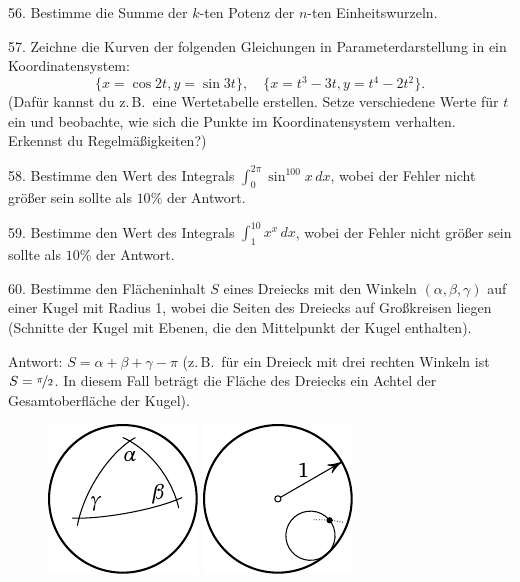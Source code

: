 \begin{problem}{56.}
	Bestimme die Summe der $k$-ten Potenz der $n$-ten Einheitswurzeln.
\end{problem}

\begin{problem}{57.}
	Zeichne die Kurven der folgenden Gleichungen in Parameterdarstellung in ein Koordinatensystem:
	\begin{equation*}
		\{x=\cos 2t, y=\sin 3t\},\quad
		\{x=t^3-3t, y=t^4-2t^2\}.
	\end{equation*}
	(Dafür kannst du z.\,B.\ eine Wertetabelle erstellen. Setze verschiedene Werte für $t$ ein und beobachte, wie sich die Punkte im Koordinatensystem verhalten. Erkennst du Regelmäßigkeiten?)
\end{problem}

\begin{problem}{58.}
	Bestimme den Wert des Integrals $\int_0^{2\pi} \sin^{100} x\,dx$, wobei der Fehler nicht größer sein sollte als $10\%$ der Antwort.
\end{problem}

\begin{problem}{59.}
	Bestimme den Wert des Integrals $\int_1^{10} x^x\,dx$, wobei der Fehler nicht größer sein sollte als $10\%$ der Antwort.
\end{problem}

\begin{problem}{60.}
	Bestimme den Flächeninhalt $S$ eines Dreiecks mit den Winkeln $(\alpha, \beta, \gamma)$ auf einer Kugel mit Radius 1, wobei die Seiten des Dreiecks auf Großkreisen liegen (Schnitte der Kugel mit Ebenen, die den Mittelpunkt der Kugel enthalten).

		\begin{note}{Antwort:} $S=\alpha+\beta+\gamma-\pi$ (z.\,B.\ für ein Dreieck mit drei rechten Winkeln ist $S=\nicefrac{\pi}{2}$. In diesem Fall beträgt die Fläche des Dreiecks ein Achtel der Gesamtoberfläche der Kugel).
		\begin{figure}
			\null\hfill
			\includegraphics{resources/taskbook-44}
			\hfill
			\includegraphics{resources/taskbook-45}
			\hfill\null
		\end{figure}
	\end{note}
\end{problem}

